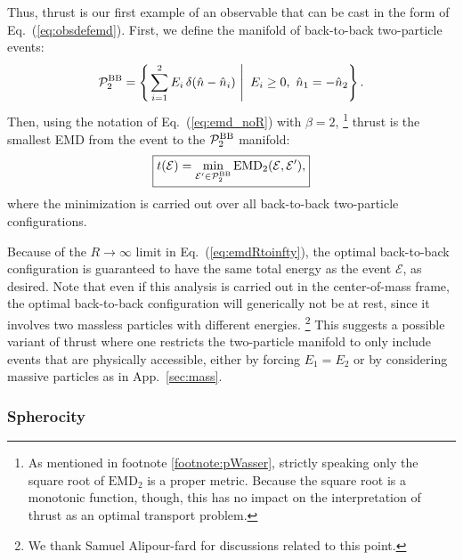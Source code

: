 \documentclass[letterpaper,11pt]{article}
\DeclareRobustCommand{\App}[1]{App.~\ref{#1}}
\DeclareRobustCommand{\Eq}[1]{Eq.~(\ref{#1})}
\begin{document}
Thus, thrust is our first example of an observable that can be cast in the form of \Eq{eq:obsdefemd}.
%
First, we define the manifold of back-to-back two-particle events:
%
\begin{equation}
\label{eq:bbmanifold}
\mathcal P^{\rm BB}_2 = \left\{\left. \sum_{i=1}^2 E_i\, \delta(\hat n - \hat n_i)\,\, \right| \,\, E_i \ge 0, \,\, \hat{n}_1 = - \hat{n}_2 \right\}.
\end{equation}
%
Then, using the notation of \Eq{eq:emd_noR} with $\beta=2$,%
%
\footnote{As mentioned in footnote \ref{footnote:pWasser}, strictly speaking only the square root of $\text{EMD}_2$ is a proper metric.
%
Because the square root is a monotonic function, though, this has no impact on the interpretation of thrust as an optimal transport problem.}
%
thrust is the smallest EMD from the event to the $\mathcal P^{\rm BB}_2$ manifold:
%
\begin{equation}
\label{eq:thrustasEMD}
\begin{boxed}{
t(\mathcal E) = \min_{\mathcal E' \in \mathcal P^{\rm BB}_2} \text{EMD}_2(\mathcal E, \mathcal E'),}
\end{boxed}
\end{equation}
%
where the minimization is carried out over all back-to-back two-particle configurations.


Because of the $R \to \infty$ limit in \Eq{eq:emdRtoinfty}, the optimal back-to-back configuration is guaranteed to have the same total energy as the event $\mathcal E$, as desired.
%
Note that even if this analysis is carried out in the center-of-mass frame, the optimal back-to-back configuration will generically not be at rest, since it involves two massless particles with different energies.%
%
\footnote{We thank Samuel Alipour-fard for discussions related to this point.}
%
This suggests a possible variant of thrust where one restricts the two-particle manifold to only include events that are physically accessible, either by forcing $E_1 = E_2$ or by considering massive particles as in \App{sec:mass}.


\subsubsection{Spherocity}
\end{document}

